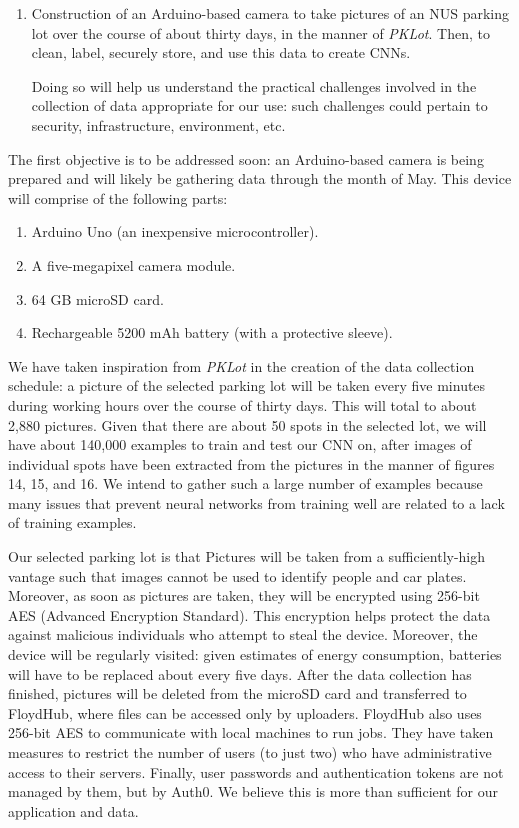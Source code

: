 \documentclass[a4paper, 11pt]{article} %
\begin{document}
	\begin{enumerate}
		\item Construction of an Arduino-based camera to take pictures of an NUS parking lot over the 
		course of about thirty days, in the manner of \textit{PKLot}. Then, to clean, label, securely store, 
		and use this data to create CNNs.
			\begin{adjustwidth}{6mm}{}
				Doing so will help us understand the practical challenges involved in the collection of  
				data appropriate for our use: such challenges could pertain to security, infrastructure, 
				environment,  etc.
			\end{adjustwidth}
		\end{enumerate}
			\newpage
		The first objective is to be addressed soon: an Arduino-based camera is being prepared and will 
		likely be gathering data through the month of May. This device will comprise of the following parts:
		\begin{enumerate}
			\item Arduino Uno (an inexpensive microcontroller).
			\item A five-megapixel camera module.
			\item 64 GB microSD card.
			\item Rechargeable 5200 mAh battery (with a protective sleeve).
		\end{enumerate}

		We have taken inspiration from \textit{PKLot} in the creation of the data collection schedule: a 
		picture of the selected parking lot will be taken every five minutes during working hours over the 
		course of thirty days. This will total to about 2,880 pictures. Given that there are about 50 spots 
		in the selected lot, we will have about 140,000 examples to train and test our CNN on, after images
		of 	individual spots have been extracted from the pictures in the manner of figures 14, 15, and 16. 
		We intend to gather such a large number of examples because many issues that prevent neural 
		networks from training well are related to a lack of training examples.
		
		Our selected parking lot is that  Pictures will be 
		taken from a sufficiently-high vantage such that images cannot be used to identify people and car 
		plates. Moreover, as soon as pictures are taken, they will be encrypted using 256-bit AES 
		(Advanced Encryption Standard). This encryption helps protect the data against malicious 
		individuals who attempt to steal the device. Moreover, the device will be regularly visited: given 
		estimates of energy consumption, batteries will have to be replaced about every five days. After 
		the data collection has finished, pictures will be deleted from the microSD card and transferred to 
		FloydHub, where files can be accessed only by uploaders. FloydHub also uses 256-bit AES to 
		communicate with local machines to run jobs. They have taken measures to restrict the number of 
		users (to just two) who have administrative access to their servers. Finally, user passwords and 
		authentication tokens are not managed by them, but by Auth0. We believe this is more than 
		sufficient for our application and data.
		
\end{document}
